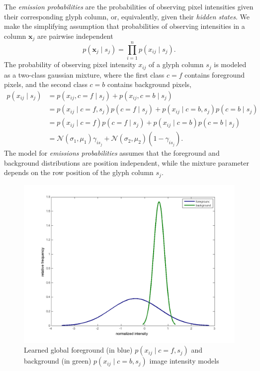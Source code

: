 \documentclass[a4paper,12pt]{article}
\begin{document}
The \emph{emission probabilities} are the probabilities of observing
pixel intensities given their corresponding glyph column, or,
equivalently, given their \emph{hidden states}. We make the
simplifying assumption that probabilities of observing intensities in
a column $\mathbf{x}_j$ are pairwise independent \[p(\mathbf{x}_j \mid
s_j) = \prod_{i=1}^np(x_{ij} \mid s_j).\] The probability of observing
pixel intensity $x_{ij}$ of a glyph column $s_j$ is modeled as a
two-class gaussian mixture, where the first class $c=f$ contains
foreground pixels, and the second class $c=b$ contains background
pixels,
\begin{align*}
  p(x_{ij} \mid s_j) &= p(x_{ij},c=f \mid s_j)+p(x_{ij},c=b \mid s_j)\\
  &= p(x_{ij}\mid c=f,s_j)p(c=f \mid s_j)+p(x_{ij} \mid c=b,s_j)p(c=b \mid s_j) \\
  &= p(x_{ij}\mid c=f)p(c=f \mid s_j)+p(x_{ij} \mid c=b)p(c=b \mid s_j) \\
  &= \mathcal{N}(\sigma_1,\mu_1)\gamma_{is_j}+\mathcal{N}(\sigma_2,\mu_2)(1-\gamma_{is_j}).
\end{align*}
The model for \emph{emissions probabilities} assumes that the
foreground and background distributions are position independent,
while the mixture parameter depends on the row position of the glyph
column $s_j$.

\begin{figure}[htp]
\centering
\includegraphics[width=\linewidth]{pics/distribution.png}
\caption{ Learned global foreground (in blue) $ p(x_{ij}\mid c=f,s_j)$ and
  background (in green) $p(x_{ij} \mid c=b,s_j)$ image intensity models }
\label{fig:distribution}
\end{figure}
\end{document}
